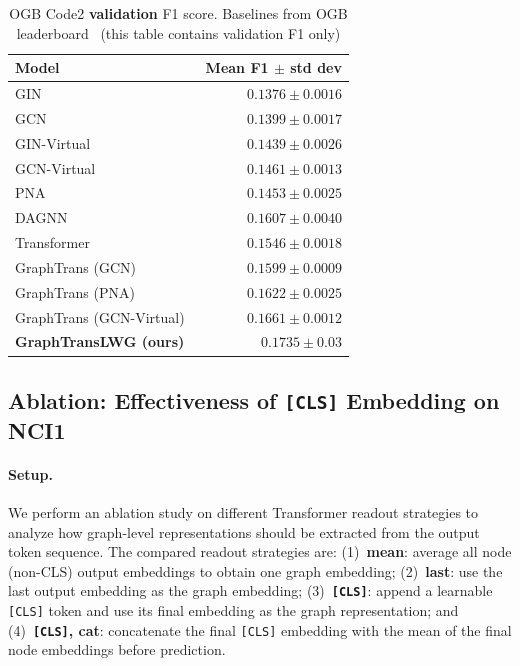 \documentclass[11pt]{article}
\begin{document}
\begin{table}[H]
\centering
\caption{OGB Code2 \textbf{validation} F1 score. Baselines from OGB leaderboard~\cite{NEURIPS2020_fb60d411} (this table contains validation F1 only)}
\label{tab:code2}
\begin{tabular}{lr}
\toprule
\textbf{Model} & \textbf{Mean F1 $\pm$ std dev} \\
\midrule
GIN~\cite{xu2018how}             & $0.1376\pm0.0016$ \\
GCN~\cite{kipf2017semisupervisedclassificationgraphconvolutional}               & $0.1399\pm0.0017$ \\
GIN-Virtual~\cite{xu2018how}     & $0.1439\pm0.0026$ \\
GCN-Virtual~\cite{kipf2017semisupervisedclassificationgraphconvolutional}       & $0.1461\pm0.0013$ \\
PNA~\cite{NEURIPS2020_99cad265}         & $0.1453\pm0.0025$ \\
DAGNN~\cite{thost2021directed}        & $0.1607\pm0.0040$ \\
\midrule
Transformer~\cite{NIPS2017_3f5ee243} & $0.1546\pm0.0018$ \\
\midrule
GraphTrans (GCN)~\cite{wu2022representinglongrangecontextgraph}         & $0.1599\pm0.0009$ \\
GraphTrans (PNA)~\cite{wu2022representinglongrangecontextgraph}         & $0.1622\pm0.0025$ \\
GraphTrans (GCN-Virtual)~\cite{wu2022representinglongrangecontextgraph} & ${0.1661\pm0.0012}$ \\
\midrule
\textbf{GraphTransLWG (ours)} & $\mathbf{0.1735\pm0.03}$ \\
\bottomrule
\end{tabular}
\end{table}
\subsection{Ablation: Effectiveness of \texttt{[CLS]} Embedding on \textsf{NCI1}}

\paragraph{Setup.}
We perform an ablation study on different Transformer readout strategies to analyze how graph-level representations should be extracted from the output token sequence. The compared readout strategies are:
(1)~\textbf{mean}: average all node (non-CLS) output embeddings to obtain one graph embedding;
(2)~\textbf{last}: use the last output embedding as the graph embedding;
(3)~\textbf{\texttt{[CLS]}}: append a learnable \texttt{[CLS]} token and use its final embedding as the graph representation;
and (4)~\textbf{\texttt{[CLS]}, cat}: concatenate the final \texttt{[CLS]} embedding with the mean of the final node embeddings before prediction.
\end{document}
